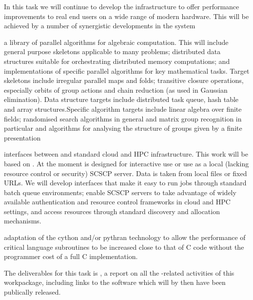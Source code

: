 \begin{workpackage}
\begin{tasklist}
\begin{task}[title=GAP,id=hpc-gap,PM=18, lead=SA, wphases={0-48!0.375}, issue=100]
In this task we will continue to develop the \GAP infrastructure to
offer performance improvements to real end users on a wide range of
modern hardware. This will be achieved by a number of synergistic
developments in the system

\begin{compactitem}
\item a library of parallel algorithms for algebraic computation. This
  will include general purpose skeletons applicable to many problems;
  distributed data structures suitable for orchestrating distributed
  memory computations; and implementations of specific parallel algorithms for key
  mathematical tasks.  Target skeletons include irregular parallel
  maps and folds; transitive closure operations, especially orbits of
  group actions and chain reduction (as used in Gaussian
  elimination). Data structure targets include distributed task
  queue, hash table and array structures.Specific algorithm targets include linear algebra over
  finite fields; randomised search algorithms in general and matrix group
  recognition in particular and algorithms for analysing the structure
  of groups given by a finite presentation
\item interfaces between \GAP and standard cloud and HPC
  infrastructure. This work will be based on .
  At the moment \GAP is designed for interactive use or use as a local
  (lacking resource control or security) SCSCP server. Data is taken
  from local files or fixed URLs. We will develop
  interfaces that make it easy to run \GAP jobs through standard batch
  queue environments; enable SCSCP servers to take advantage of
  widely available authentication and resource control frameworks in
  cloud and HPC settings, and access resources through standard
  discovery and allocation mechanisms.

\item adaptation of the cython and/or pythran technology to allow the
  performance of critical \GAP language subroutines to be increased
  close to that of C code without the programmer cost of a full C implementation.
\end{compactitem}
The deliverables for this task is  , a
report on all the \GAP-related activities of this workpackage,
including links to the software which will by then have been
publically released.

\end{task}



\end{tasklist}
\end{workpackage}
